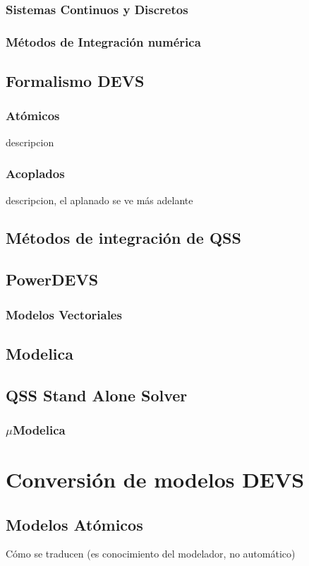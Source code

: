 \documentclass[a4paper,	11pt]{article}
\begin{document}
\subsubsection{Sistemas Continuos y Discretos}
\subsubsection{Métodos de Integración numérica}
\subsection{Formalismo DEVS}
\subsubsection{Atómicos }
	descripcion
\subsubsection{Acoplados}
	descripcion, el aplanado se ve más adelante
\subsection {Métodos de integración de QSS}
\subsection {PowerDEVS}
\subsubsection{Modelos Vectoriales}
\subsection{Modelica}
\subsection{QSS Stand Alone Solver}
\subsubsection{$\mu$Modelica}

\section{Conversión de modelos DEVS}
\subsection{Modelos Atómicos}
Cómo se traducen (es conocimiento del modelador, no automático)
\end{document}

